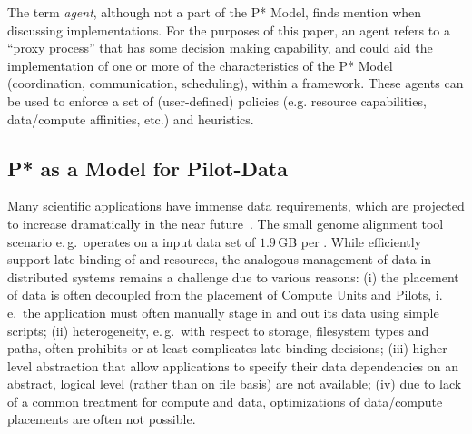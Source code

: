 \documentclass[conference]{IEEEtran}
\begin{document}
The term {\it agent}, although not a part of the P* Model, finds
mention when discussing implementations. For the purposes of this
paper, an agent refers to a ``proxy process'' 
that has some decision making capability, and could aid the
implementation of one or more of the characteristics of the P* Model
(coordination, communication, scheduling), within a \pilotjob
framework.  These agents can be used to enforce a set of
(user-defined) policies (e.g.  resource capabilities, data/compute
affinities, etc.) and heuristics.




\subsection{P* as a Model for Pilot-Data}
\label{sec:pilot-data}




Many scientific applications have immense data requirements, which are
projected to increase dramatically in the near future~\cite{hey2009}. The
small genome alignment tool scenario e.\,g.\ operates on a input data set of
$1.9$\,GB per \cu. While \pilotjobs efficiently support late-binding of
\I{\computeunits} and resources, the analogous management of data in
distributed systems remains a challenge due to various reasons: (i) the
placement of data is often decoupled from the placement of Compute Units and
Pilots, i.\,e.\ the application must often manually stage in and out its data
using simple scripts; (ii) heterogeneity, e.\,g.\ with respect to storage,
filesystem types and paths, often prohibits or at least complicates late
binding decisions; (iii) higher-level abstraction that allow applications to
specify their data dependencies on an abstract, logical level (rather than on
file basis) are not available; (iv) due to lack of a common treatment for
compute and data, optimizations of data/compute placements are often not
possible.
\end{document}
